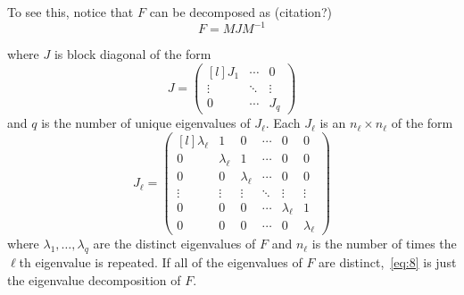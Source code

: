 \documentclass[12pt,fleqn]{article}
\begin{document}
To see this, notice that $F$ can be decomposed as (citation?)
\begin{equation}
  \label{eq:8}
  F = M J M^{-1}
\end{equation}

where $J$ is block diagonal of the form
\[
J = \begin{pmatrix*}[l]
  J_1 & \cdots & 0 \\
  \vdots & \ddots & \vdots \\
  0 & \cdots & J_q
\end{pmatrix*}
\]
and $q$ is the number of unique eigenvalues of $J_{\ell}$. Each
$J_\ell$ is an $n_\ell \times n_\ell$ of the form
\[
J_\ell =
\begin{pmatrix*}[l]
  \lambda_\ell & 1 & 0 & \cdots & 0 & 0 \\
  0 & \lambda_\ell & 1 & \cdots & 0 & 0 \\
  0 & 0 & \lambda_\ell & \cdots & 0 & 0 \\
  \vdots & \vdots & \vdots & \ddots & \vdots & \vdots \\
  0 & 0 & 0 & \cdots & \lambda_\ell & 1 \\
  0 & 0 & 0 & \cdots & 0 & \lambda_\ell
\end{pmatrix*}
\]
where $\lambda_1,\dots,\lambda_q$ are the distinct eigenvalues of $F$
and $n_\ell$ is the number of times the $\ell$th eigenvalue is
repeated.  If all of the eigenvalues of $F$ are
distinct,~\eqref{eq:8} is just the eigenvalue decomposition of $F$.
\end{document}
